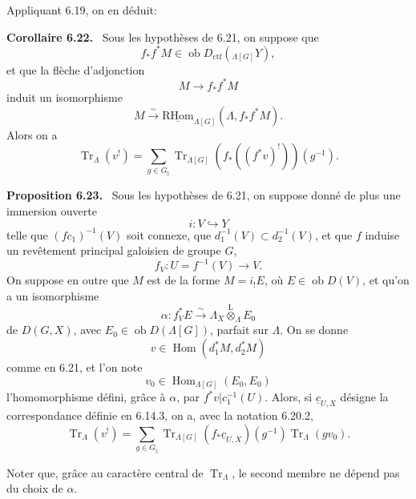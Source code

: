 \documentclass[11pt]{article}
\newenvironment{statement}[1]{\par\medskip\noindent\textbf{#1.}\ }{\par\medskip}
\DeclareMathOperator{\Hom}{Hom}
\newcommand{\R}{\mathrm{R}}\newcommand{\RHomCore}{\mathrm{RHom}}
\providecommand{\RHom}{\RHomCore}
\providecommand{\uRHom}{\underline{\RHom}}
\providecommand{\Tr}{\operatorname{Tr}}
\providecommand{\Tr}{\operatorname{Tr}}
\providecommand{\lten}{\overset{\mathrm L}{\otimes}}
\providecommand{\Ob}{\operatorname{ob}}
\providecommand{\Tr}{\operatorname{Tr}}
\providecommand{\RHom}{\RHomCore}
\providecommand{\Hom}{\operatorname{Hom}}
\providecommand{\lten}{\overset{\mathrm L}{\otimes}}
\providecommand{\RHom}{\R\mathcal{H}om}
\providecommand{\lten}{\overset{\mathrm L}{\otimes}}
\providecommand{\Ob}{\operatorname{ob}}
\providecommand{\R}{\mathrm R}
\providecommand{\Tr}{\operatorname{Tr}}
\providecommand{\lten}{\overset{\mathrm L}{\otimes}}
\providecommand{\lten}{\overset{\mathrm L}{\otimes}}
\providecommand{\Ob}{\operatorname{Ob}}
\providecommand{\lten}{\overset{\mathrm L}{\otimes}}
\providecommand{\RHom}{\RHomCore}
\providecommand{\Hom}{\operatorname{Hom}}
\providecommand{\Tr}{\operatorname{Tr}}
\providecommand{\Ob}{\operatorname{ob}}
\providecommand{\Ob}{\operatorname{Ob}}
\providecommand{\lten}{\overset{\mathrm L}{\otimes}}
\begin{document}
Appliquant 6.19, on en déduit:

\begin{statement}{Corollaire 6.22}
Sous les hypothèses de 6.21, on suppose que
\[
f_*f^*M\in\Ob D_{\mathrm{ctf}}({}_{\Lambda[G]}Y),
\]
et que la flèche d'adjonction
\[
M\to f_*f^*M
\]
induit un isomorphisme
\[
M\xrightarrow{\sim}\uRHom_{\Lambda[G]}(\Lambda,f_*f^*M).
\]
Alors on a
\begin{equation}
\Tr_{\Lambda}(v^!)=
\sum_{g\in G_{\natural}}\Tr_{\Lambda[G]}(f_*((f^*v)^!))(g^{-1}).
\tag{6.22.1}
\end{equation}
\end{statement}

\begin{statement}{Proposition 6.23}
Sous les hypothèses de 6.21, on suppose donné de plus une immersion ouverte
\[
i:V\hookrightarrow Y
\]
telle que $(fc_1)^{-1}(V)$ soit connexe, que $d_1^{-1}(V)\subset d_2^{-1}(V)$, et que $f$ induise un revêtement principal galoisien de groupe $G$,
\[
f_V:U=f^{-1}(V)\to V.
\]
On suppose en outre que $M$ est de la forme $M=i_!E$, où $E\in\Ob D(V)$, et qu'on a un isomorphisme
\[
\alpha:f_V^*E\xrightarrow{\sim}\Lambda_X\lten_{\Lambda}E_0
\]
de $D(G,X)$, avec $E_0\in\Ob D(\Lambda[G])$, parfait sur $\Lambda$. On se donne
\[
v\in\Hom(d_1^*M,d_2^*M)
\]
comme en 6.21, et l'on note
\[
v_0\in\Hom_{\Lambda[G]}(E_0,E_0)
\]
l'homomorphisme défini, grâce à $\alpha$, par $f^*v|c_1^{-1}(U)$. Alors, si $\underline c_{U,X}$ désigne la correspondance définie en 6.14.3, on a, avec la notation 6.20.2,
\begin{equation}
\Tr_{\Lambda}(v^!)
=
\sum_{g\in G_{\natural}}
\Tr_{\Lambda[G]}(f_*\underline c_{U,X})(g^{-1})\Tr_{\Lambda}(gv_0).
\tag{6.23.1}
\end{equation}
\end{statement}

Noter que, grâce au caractère central de $\Tr_{\Lambda}$, le second membre ne dépend pas du choix de $\alpha$.
\end{document}
